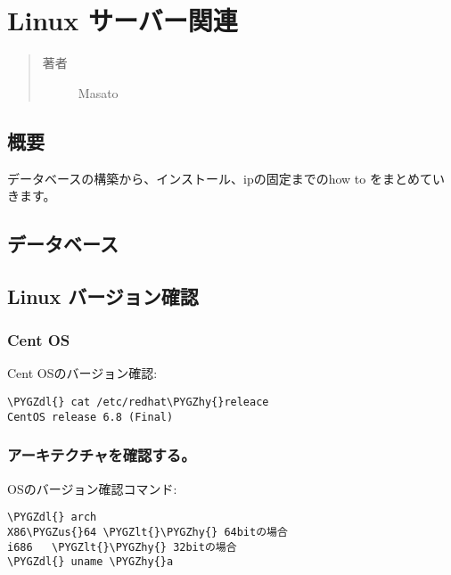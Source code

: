 \documentclass[letterpaper,10pt,dvipdfmx]{sphinxmanual}
\def\PYGZus{\char`\_}
\def\PYGZlt{\char`\<}
\def\PYGZdl{\char`\$}
\def\PYGZhy{\char`\-}
\begin{document}
\chapter{Linux サーバー関連}
\label{learned_linux_server::doc}\label{learned_linux_server:linux}\begin{quote}\begin{description}
\item[{著者}] \leavevmode
Masato

\end{description}\end{quote}


\section{概要}
\label{learned_linux_server:id1}
データベースの構築から、インストール、ipの固定までのhow to をまとめていきます。


\section{データベース}
\label{learned_linux_server:id2}

\section{Linux バージョン確認}
\label{learned_linux_server:id3}

\subsection{Cent OS}
\label{learned_linux_server:cent-os}
Cent OSのバージョン確認:

\begin{Verbatim}[commandchars=\\\{\}]
\PYGZdl{} cat /etc/redhat\PYGZhy{}releace
CentOS release 6.8 (Final)
\end{Verbatim}


\subsection{アーキテクチャを確認する。}
\label{learned_linux_server:id4}
OSのバージョン確認コマンド:

\begin{Verbatim}[commandchars=\\\{\}]
\PYGZdl{} arch
X86\PYGZus{}64 \PYGZlt{}\PYGZhy{} 64bitの場合
i686   \PYGZlt{}\PYGZhy{} 32bitの場合
\PYGZdl{} uname \PYGZhy{}a
\end{Verbatim}
\end{document}
